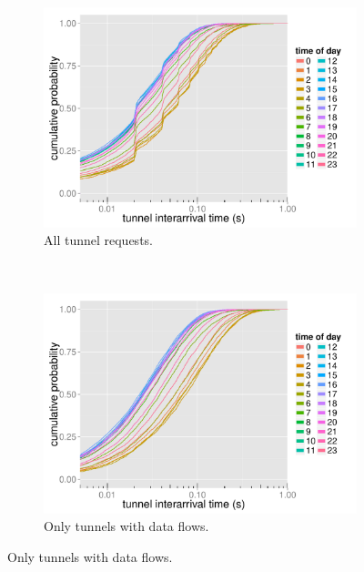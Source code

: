\begin{figure}[htb]
        \centering    
        \begin{subfigure}[b]{0.5\textwidth}    
                \centering
                \includegraphics[width=\textwidth]{images/R-IAT-successful-2h-ecdfs.pdf}
                \caption{All tunnel requests.}
                \label{c4:fig:IAT-ecdf-2h-successful}
        \end{subfigure}%
        ~
        \begin{subfigure}[b]{0.5\textwidth}
                \centering
                \includegraphics[width=\textwidth]{images/R-IAT-fromflows-ecdfs-2h.pdf}
                \caption{Only tunnels with data flows.}
                \label{c4:fig:IAT-ecdf-2h-active}
        \end{subfigure}


\end{figure}
